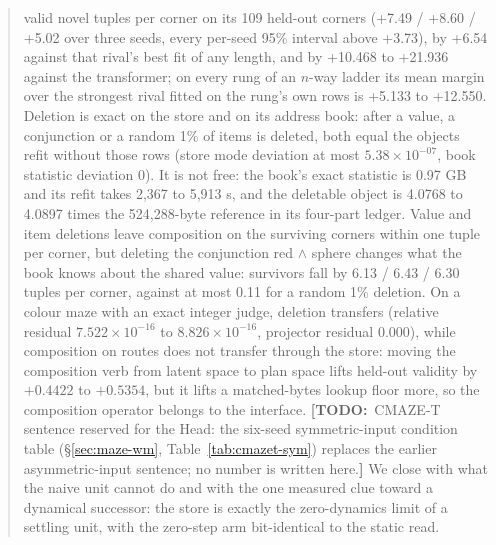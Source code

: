 \documentclass{article} %
\newcommand{\TODO}[1]{{\color{orange}\textbf{[TODO:}~#1\textbf{]}}}
\newcommand{\sci}[2]{\ensuremath{#1\times10^{#2}}}
\begin{document}
\begin{abstract}
valid novel tuples per corner on its 109 held-out corners (+7.49 / +8.60 / +5.02 over three seeds,
every per-seed 95\% interval above +3.73), by +6.54 against that rival's best fit of any length, and
by +10.468 to +21.936 against the transformer; on every rung of an $n$-way ladder its mean margin
over the strongest rival fitted on the rung's own rows is +5.133 to +12.550.
Deletion is exact on the store and on its address book: after a value, a conjunction or a random
1\% of items is deleted, both equal the objects refit without those rows (store mode deviation at
most \sci{5.38}{-07}, book statistic deviation 0). It is not free: the book's exact statistic is %
0.97 GB and its refit takes 2,367 to 5,913 s, and the deletable object is 4.0768 to 4.0897 times %
the 524,288-byte reference in its four-part ledger. Value and item deletions leave composition on %
the surviving corners within one tuple per corner, but deleting the conjunction red $\wedge$ sphere
changes what the book knows about the shared value: survivors fall by 6.13 / 6.43 / 6.30 tuples per %
corner, against at most 0.11 for a random 1\% deletion. %
On a colour maze with an exact integer judge, deletion transfers
(relative residual \sci{7.522}{-16} to \sci{8.826}{-16}, projector residual 0.000), %
while composition on routes does not transfer through the store: moving the composition verb from
latent space to plan space lifts held-out validity by $+0.4422$ to $+0.5354$, but it lifts a
matched-bytes lookup floor more, so the composition operator belongs to the interface.
\TODO{CMAZE-T sentence reserved for the Head: the six-seed symmetric-input condition table
(\S\ref{sec:maze-wm}, Table~\ref{tab:cmazet-sym}) replaces the earlier asymmetric-input sentence; no
number is written here.}
We close with what the naive unit cannot do and with the one measured clue toward a
dynamical successor: the store is exactly the zero-dynamics limit of a settling unit, with
the zero-step arm bit-identical to the static read. %
\end{abstract}
\end{document}
